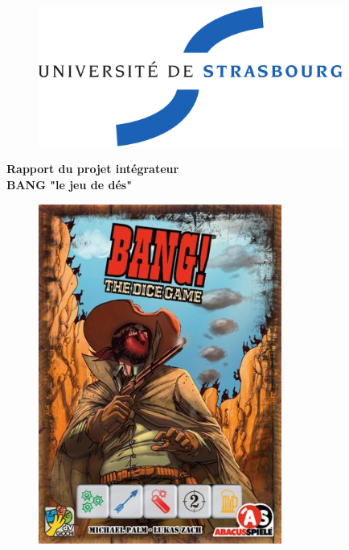 \documentclass[a4paper,11pt]{article}
\begin{document}
\begin{titlepage}

  \begin{center}

    \begin{figure}[!htbp]
    \centering
    \includegraphics[width=10cm]{Img/image1.png}
    \end{figure}

    \Large{\textbf{Rapport du projet intégrateur}} \\
    \Large{\textbf{BANG "le jeu de dés"}} \\

    \begin{figure}[!htbp]
    \centering
    \includegraphics[width=8cm]{Img/image3.jpg}
    \end{figure}

  \end{center}

  \newpage

\end{titlepage}
\end{document}
